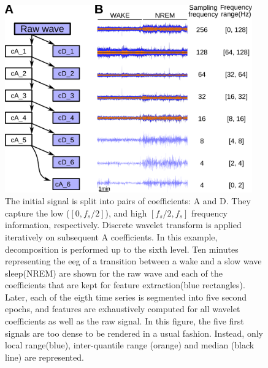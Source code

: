 
\begin{figure}[h!]

  \centering    
    \includegraphics[width=0.95\textwidth]{figures/dwd.pdf}
  \caption{
  The initial signal is split into pairs of coefficients: A and D. They capture the low ($[0, f_s/2]$), and high $[f_s/2, f_s]$ frequency information, respectively.
  Discrete wavelet transform is applied iteratively on subsequent A coefficients. In this example, decomposition is performed up to the sixth level.
  Ten minutes representing the \gls{eeg} of a transition between a wake and a slow wave sleep(NREM) are shown for the raw wave and each of the coefficients that are kept for feature extraction(blue rectangles). 
  Later, each of the eigth time series is segmented into five second epochs, and features are exhaustively computed for all wavelet coefficients as well as the raw signal.
  In this figure, the five first signals are too dense to be rendered in a usual fashion. Instead, only local range(blue), inter-quantile range (orange) and median (black line) are represented.
  \label{fig:dwd}
  }
           
\end{figure}

